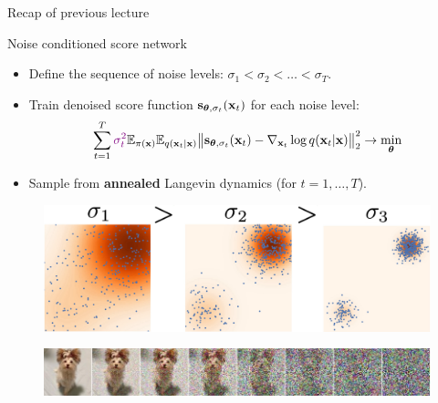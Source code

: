\begin{frame}{Recap of previous lecture}
	\begin{block}{Noise conditioned score network}
		\begin{itemize}
			\item Define the sequence of noise levels: $\sigma_1 < \sigma_2 < \dots < \sigma_T$.
			\item Train denoised score function $\mathbf{s}_{\boldsymbol{\theta}, \sigma_t}(\mathbf{x}_t)$ for each noise level:
			\vspace{-0.3cm}
			\[
				\sum_{t=1}^T {\color{violet}\sigma_t^2} \mathbb{E}_{\pi(\mathbf{x})} \mathbb{E}_{q(\mathbf{x}_t | \mathbf{x})}\bigl\| \mathbf{s}_{\boldsymbol{\theta}, \sigma_t}(\mathbf{x}_t) - \nabla_{\mathbf{x}_t} \log q(\mathbf{x}_t | \mathbf{x}) \bigr\|^2_2 \rightarrow \min_{\boldsymbol{\theta}}
			\]
			\vspace{-0.5cm}
			\item Sample from \textbf{annealed} Langevin dynamics (for $t=1, \dots, T$).
		\end{itemize}
	\end{block}
	\begin{figure}
		\includegraphics[width=0.55\linewidth]{figs/multi_scale}
	\end{figure}
	\begin{figure}
		\includegraphics[width=\linewidth]{figs/duoduo}
	\end{figure}
\end{frame}
